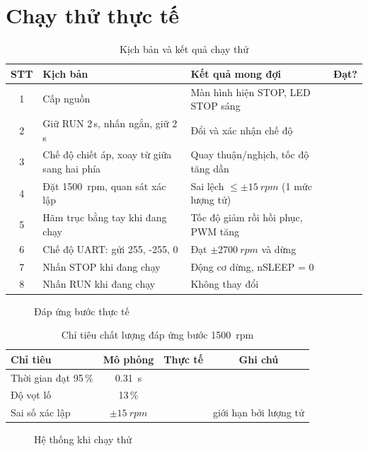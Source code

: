 \section{Chạy thử thực tế}
\label{sec:chaythu}

\begin{table}[H]
\centering\small
\caption{Kịch bản và kết quả chạy thử}
\label{tab:runtest}
\begin{tabularx}{\linewidth}{@{}c>{\raggedright\arraybackslash}X>{\raggedright\arraybackslash}p{4cm}c@{}}
\toprule
\textbf{STT} & \textbf{Kịch bản} & \textbf{Kết quả mong đợi} & \textbf{Đạt?}\\
\midrule
1 & Cấp nguồn & Màn hình hiện STOP, LED STOP sáng & \bosung{}\\
2 & Giữ RUN 2\,s, nhấn ngắn, giữ 2\,s & Đổi và xác nhận chế độ & \bosung{}\\
3 & Chế độ chiết áp, xoay từ giữa sang hai phía & Quay thuận/nghịch, tốc độ tăng dần & \bosung{}\\
4 & Đặt \SI{1500}{rpm}, quan sát xác lập & Sai lệch $\le\pm\SI{15}{rpm}$ (1 mức lượng tử) & \bosung{}\\
5 & Hãm trục bằng tay khi đang chạy & Tốc độ giảm rồi hồi phục, PWM tăng & \bosung{}\\
6 & Chế độ UART: gửi 255, -255, 0 & Đạt $\pm\SI{2700}{rpm}$ và dừng & \bosung{}\\
7 & Nhấn STOP khi đang chạy & Động cơ dừng, nSLEEP = 0 & \bosung{}\\
8 & Nhấn RUN khi đang chạy & Không thay đổi & \bosung{}\\
\bottomrule
\end{tabularx}
\end{table}

\begin{figure}[H]
\centering
{}
\caption{Đáp ứng bước thực tế}
\label{fig:stepreal}
\end{figure}

\begin{table}[H]
\centering\small
\caption{Chỉ tiêu chất lượng đáp ứng bước \SI{1500}{rpm}}
\label{tab:kpi}
\begin{tabular}{@{}lccc@{}}
\toprule
\textbf{Chỉ tiêu} & \textbf{Mô phỏng} & \textbf{Thực tế} & \textbf{Ghi chú}\\
\midrule
Thời gian đạt 95\,\% & \SI{0.31}{\second} & \bosung{} & \\
Độ vọt lố & 13\,\% & \bosung{} & \\
Sai số xác lập & $\pm\SI{15}{rpm}$ & \bosung{} & giới hạn bởi lượng tử\\
\bottomrule
\end{tabular}
\end{table}

\begin{figure}[H]
\centering
{}
\caption{Hệ thống \proj{} khi chạy thử}
\label{fig:runtest}
\end{figure}
